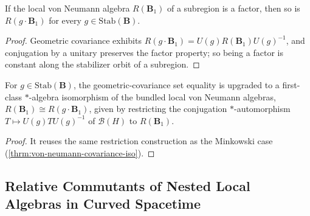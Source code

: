 \begin{theorem}
    \label{thrm:von-neumann-factor-orbit-in-curved-spacetime}
    \leanok
    If the local von Neumann algebra $R(\mathbf{B}_1)$ of a subregion is a factor, then so is $R(g \cdot \mathbf{B}_1)$ for every $g \in \mathrm{Stab}(\mathbf{B})$.
\end{theorem}
\begin{proof}
    \leanok
    Geometric covariance exhibits $R(g \cdot \mathbf{B}_1) = U(g) R(\mathbf{B}_1) U(g)^{-1}$, and conjugation by a unitary preserves the factor property; so being a factor is constant along the stabilizer orbit of a subregion.
\end{proof}

\begin{theorem}
    \label{thrm:von-neumann-covariance-iso-in-curved-spacetime}
    \leanok
    For $g \in \mathrm{Stab}(\mathbf{B})$, the geometric-covariance set equality is upgraded to a first-class $*$-algebra isomorphism of the bundled local von Neumann algebras, $R(\mathbf{B}_1) \cong R(g \cdot \mathbf{B}_1)$, given by restricting the conjugation $*$-automorphism $T \mapsto U(g) T U(g)^{-1}$ of $\mathcal{B}(H)$ to $R(\mathbf{B}_1)$.
\end{theorem}
\begin{proof}
    \leanok
    It reuses the same restriction construction as the Minkowski case (\ref{thrm:von-neumann-covariance-iso}).
\end{proof}

\subsection{Relative Commutants of Nested Local Algebras in Curved Spacetime}

